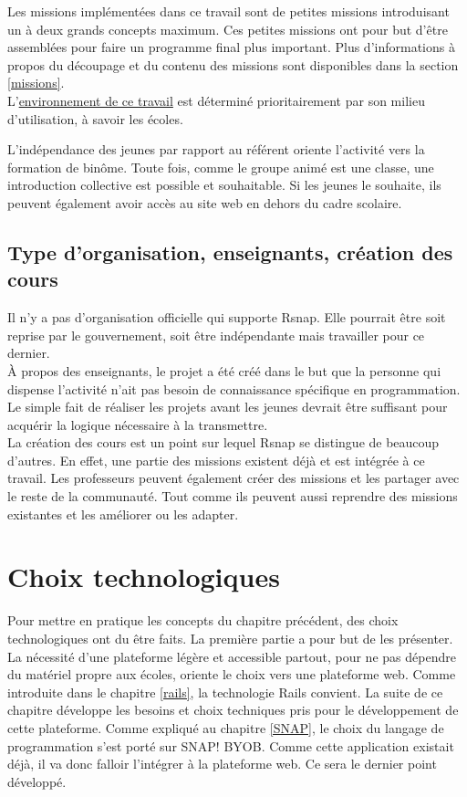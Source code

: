 Les missions implémentées dans ce travail sont de petites missions introduisant un à deux grands concepts maximum. Ces petites missions ont pour but d'être assemblées pour faire un programme final plus important. Plus d'informations à propos du découpage et du contenu des missions sont disponibles dans la section \ref{missions}.\\

L'\underline{environnement de ce travail} est déterminé prioritairement par son milieu d'utilisation, à savoir les écoles. 

L'indépendance des jeunes par rapport au référent oriente l'activité vers la formation de binôme. Toute fois, comme le groupe animé est une classe, une introduction collective est possible et souhaitable. 
Si les jeunes le souhaite, ils peuvent également avoir accès au site web en dehors du cadre scolaire.

\subsection{Type d'organisation, enseignants, création des cours}
Il n'y a pas d'organisation officielle qui supporte Rsnap. Elle pourrait être soit reprise par le gouvernement, soit être indépendante mais travailler pour ce dernier.\\

À propos des enseignants, le projet a été créé dans le but que la personne qui dispense l'activité n'ait pas besoin de connaissance spécifique en programmation. Le simple fait de réaliser les projets avant les jeunes devrait être suffisant pour acquérir la logique nécessaire à la transmettre.\\

La création des cours est un point sur lequel Rsnap se distingue de beaucoup d'autres. En effet, une partie des missions existent déjà et est intégrée à ce travail. Les professeurs peuvent également créer des missions et les partager avec le reste de la communauté. Tout comme ils peuvent aussi reprendre des missions existantes et les améliorer ou les adapter. %

\section{Choix technologiques} %
Pour mettre en pratique les concepts du chapitre précédent, des choix technologiques ont du être faits. La première partie a pour but de les présenter. 
La nécessité d'une plateforme légère et accessible partout, pour ne pas dépendre du matériel propre aux écoles, oriente le choix vers une plateforme web. Comme introduite dans le chapitre \ref{rails}, la technologie Rails convient. La suite de ce chapitre développe les besoins et choix techniques pris pour le développement de cette plateforme. 
Comme expliqué au chapitre \ref{SNAP}, le choix du langage de programmation s'est porté sur SNAP! BYOB. Comme cette application existait déjà, il va donc falloir l'intégrer à la plateforme web. Ce sera le dernier point développé.

